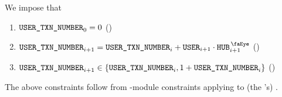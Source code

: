 We impose that
\begin{enumerate}
	\item $\texttt{USER}\texttt{\_}\texttt{TXN\_NUMBER} _{0} = 0$ (\sanityCheck)
	\item $\userTransactionNumber _{i + 1} = \userTransactionNumber _{i} + \user _{i + 1} \cdot \isUserTxnHubView _{i + 1}$ (\sanityCheck)
	\item $\texttt{USER}\texttt{\_}\texttt{TXN\_NUMBER} _{i + 1} \in \{ \texttt{USER}\texttt{\_}\texttt{TXN\_NUMBER} _{i}, 1 + \texttt{USER}\texttt{\_}\texttt{TXN\_NUMBER} _{i} \}$ (\sanityCheck)
\end{enumerate}
\saNote{}
The above constraints follow from \hubMod{}-module constraints
applying to (the \hubMod{}'s) \userTransactionNumber{}.
